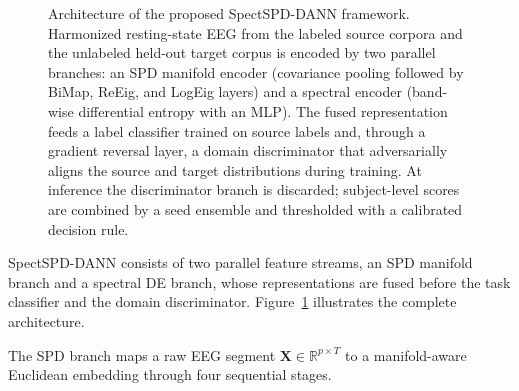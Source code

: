 \begin{figure}[!t]
{%
  }
  \caption{Architecture of the proposed SpectSPD-DANN framework. Harmonized
  resting-state EEG from the labeled source corpora and the unlabeled held-out
  target corpus is encoded by two parallel branches: an SPD manifold encoder
  (covariance pooling followed by BiMap, ReEig, and LogEig layers) and a spectral
  encoder (band-wise differential entropy with an MLP). The fused representation
  feeds a label classifier trained on source labels and, through a gradient
  reversal layer, a domain discriminator that adversarially aligns the source and
  target distributions during training. At inference the discriminator branch is
  discarded; subject-level scores are combined by a seed ensemble and thresholded
  with a calibrated decision rule.}
  \label{fig:arch}
\end{figure}

SpectSPD-DANN consists of two parallel feature streams, an SPD manifold
branch and a spectral DE branch, whose representations are fused before the
task classifier and the domain discriminator. Figure~\ref{fig:arch} illustrates
the complete architecture.

The SPD branch maps a raw EEG segment $\mathbf{X}\in\mathbb{R}^{p\times T}$
to a manifold-aware Euclidean embedding through four sequential stages.

